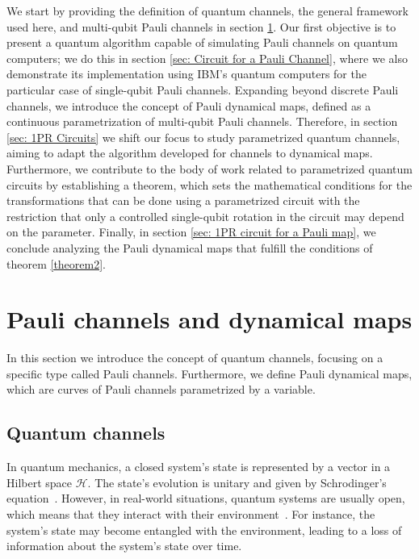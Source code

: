\documentclass[10pt,letterpaper]{article} %
\begin{document}
We start by providing the definition of quantum channels, the general framework
used here, and multi-qubit Pauli channels in section \ref{sec: Pauli Channels}.
Our first objective is to present a quantum algorithm capable of simulating
Pauli channels on quantum computers; we do this in section \ref{sec: Circuit
for a Pauli Channel}, where we also demonstrate its implementation using IBM's
quantum computers for the particular case of single-qubit Pauli channels. 
Expanding beyond discrete Pauli channels, we introduce the concept of Pauli
dynamical maps, defined as a continuous parametrization of multi-qubit Pauli
channels.  Therefore, in section \ref{sec: 1PR Circuits} we shift our focus to
study parametrized quantum channels, aiming to adapt the algorithm developed
for channels to dynamical maps.  Furthermore, we contribute to the body of work
related to parametrized quantum circuits by establishing a theorem,
which  sets the mathematical conditions for the transformations
that can be done using a parametrized circuit with the restriction that only a
controlled single-qubit
rotation in the circuit may depend on the parameter.  Finally, in
section \ref{sec: 1PR circuit for a Pauli map}, we conclude analyzing the Pauli
dynamical maps that fulfill the conditions of theorem \ref{theorem2}. 

\section{Pauli channels and dynamical maps}  \label{sec: Pauli Channels} %


In this section  we introduce the concept of quantum channels, focusing on a
specific type called Pauli channels.  Furthermore, we define Pauli dynamical
maps, which are curves of Pauli channels parametrized by a variable.
\subsection{Quantum channels} \label{subsec: Quantum Channels} %


In quantum mechanics, a closed system's state is represented by a vector in a
Hilbert space $\mathcal{H}$.  The state's evolution is unitary and given by
Schrodinger's equation~\cite{Rieffel}.  However, in real-world situations,
quantum systems are usually open, which means that they interact with their
environment~\cite{breuer2007theory}.  For instance, the system's state may become
entangled with the environment, leading to a loss of information about the
system's state over time.
\end{document}
